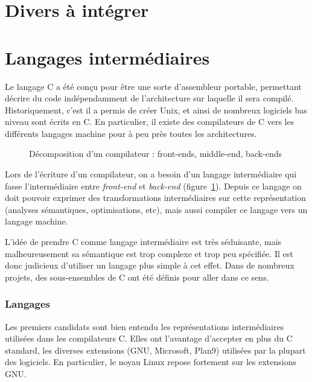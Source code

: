 \section*{Divers à intégrer}

\cite{jfp92}
\cite{popl94}
\cite{ToTa1993}

\section{Langages intermédiaires}

Le langage C \cite{KandR,AnsiC} a été conçu pour être une sorte d'assembleur
portable, permettant décrire du code indépendamment de l'architecture sur
laquelle il sera compilé. Historiquement, c'est il a permis de créer Unix, et
ainsi de nombreux logiciels bas niveau sont écrits en C. En particulier, il
existe des compilateurs de C vers les différents langages machine pour à peu
près toutes les architectures.

\begin{figure}
  \centering

  

  \caption{Décomposition d'un compilateur : front-ends, middle-end, back-ends}
  \label{fig:middle-end}
\end{figure}

Lors de l'écriture d'un compilateur, on a besoin d'un langage intermédiaire qui
fasse l'intermédiaire entre \emph{front-end} et \emph{back-end}
(figure~\ref{fig:middle-end}). Depuis ce langage on doit pouvoir exprimer des
transformations intermédiaires sur cette représentation (analyses sémantiques,
optimisations, etc), mais aussi compiler ce langage vers un langage machine.

L'idée de prendre C comme langage intermédiaire est très séduisante, mais
malheureusement sa sémantique est trop complexe et trop peu spécifiée. Il est
donc judicieux d'utiliser un langage plus simple à cet effet. Dans de nombreux
projets, des sous-ensembles de C ont été définis pour aller dans ce sens.

\subsubsection{Langages}

Les premiers candidats sont bien entendu les représentations intermédiaires
utilisées dans les compilateurs C. Elles ont l'avantage d'accepter en plus du C
standard, les diverses extensions (GNU, Microsoft, Plan9) utilisées par la
plupart des logiciels. En particulier, le noyau Linux repose fortement sur les
extensions GNU.

